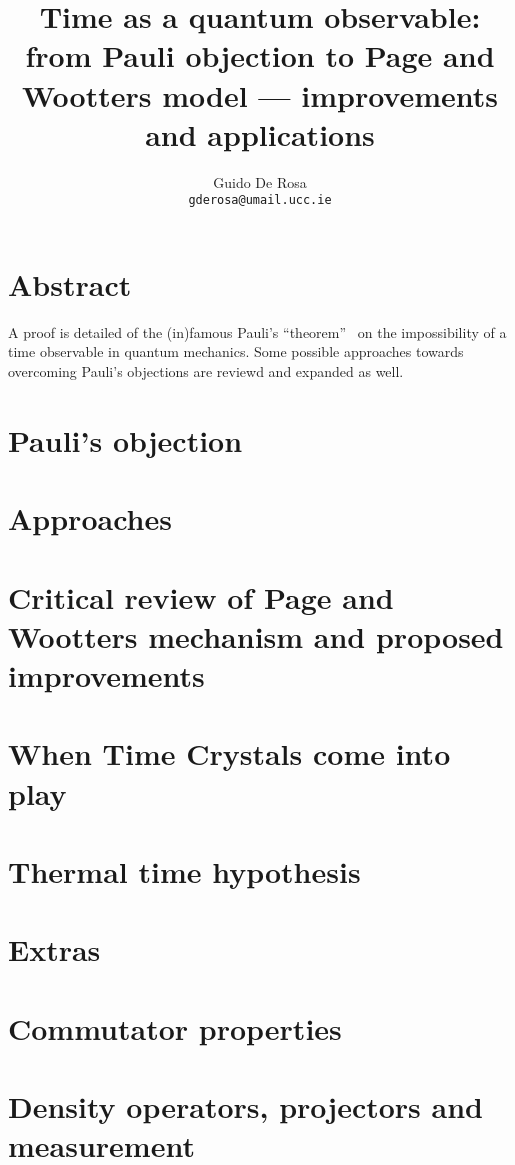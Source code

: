 \documentclass{book}
\author{Guido De Rosa \\ \small\tt{gderosa@umail.ucc.ie}}
\title{Time as a quantum observable: from Pauli objection to Page and Wootters model --- improvements and applications}
\begin{document}
\maketitle

\tableofcontents

\chapter*{Abstract}
A proof is detailed of the (in)famous Pauli's ``theorem''~\cite{PauliFootnote}
on the impossibility of a time observable in quantum mechanics. Some possible
approaches towards overcoming Pauli's objections are reviewd and expanded as well.

\chapter{Pauli's objection}



\chapter{Approaches}


\chapter{Critical review of Page and Wootters mechanism and proposed improvements}


\chapter{When Time Crystals come into play}


\chapter{Thermal time hypothesis}


\chapter{Extras}


\appendix
\chapter{Commutator properties}

\chapter{Density operators, projectors and measurement}




\end{document}
